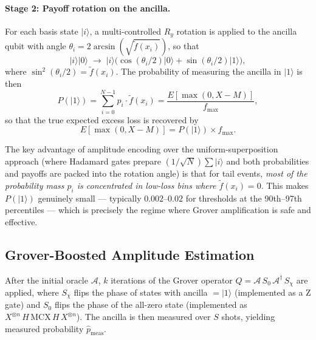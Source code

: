\documentclass[11pt,a4paper]{article}
\begin{document}
\paragraph{Stage 2: Payoff rotation on the ancilla.} For each basis state $|i\rangle$, a multi-controlled $R_y$ rotation is applied to the ancilla qubit with angle $\theta_i = 2\arcsin(\sqrt{\tilde{f}(x_i)})$, so that
\begin{equation}
|i\rangle|0\rangle \;\longrightarrow\; |i\rangle\bigl(\cos(\theta_i/2)|0\rangle + \sin(\theta_i/2)|1\rangle\bigr),
\end{equation}
where $\sin^2(\theta_i/2) = \tilde{f}(x_i)$. The probability of measuring the ancilla in $|1\rangle$ is then
\begin{equation}
P(|1\rangle) = \sum_{i=0}^{N-1} p_i \cdot \tilde{f}(x_i) = \frac{E[\max(0, X - M)]}{f_{\max}},
\label{eq:readout}
\end{equation}
so that the true expected excess loss is recovered by
\begin{equation}
E[\max(0, X - M)] = P(|1\rangle) \times f_{\max}.
\label{eq:rescale}
\end{equation}

The key advantage of amplitude encoding over the uniform-superposition approach (where Hadamard gates prepare $(1/\sqrt{N})\sum|i\rangle$ and both probabilities and payoffs are packed into the rotation angle) is that for tail events, \emph{most of the probability mass $p_i$ is concentrated in low-loss bins where $\tilde{f}(x_i) = 0$}. This makes $P(|1\rangle)$ genuinely small --- typically $0.002$--$0.02$ for thresholds at the 90th--97th percentiles --- which is precisely the regime where Grover amplification is safe and effective.

\subsection{Grover-Boosted Amplitude Estimation}

After the initial oracle $\mathcal{A}$, $k$ iterations of the Grover operator $Q = \mathcal{A}\, S_0\, \mathcal{A}^\dagger\, S_\chi$ are applied, where $S_\chi$ flips the phase of states with ancilla $= |1\rangle$ (implemented as a Z gate) and $S_0$ flips the phase of the all-zero state (implemented as $X^{\otimes n}\, H\, \text{MCX}\, H\, X^{\otimes n}$). The ancilla is then measured over $S$ shots, yielding measured probability $\hat{p}_{\text{meas}}$.
\end{document}
